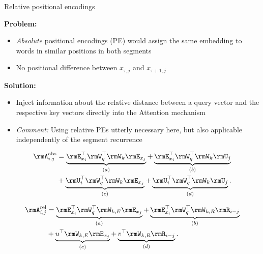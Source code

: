 \documentclass[11pt,compress,t,notes=noshow, xcolor=table]{beamer}
\begin{document}

\begin{vbframe}{Relative positional encodings}

\vfill

\textbf{Problem:}

\begin{itemize}
	\item \textit{Absolute} positional encodings (PE) would assign the same embedding to words in similar positions in both segments
	\item No positional difference between $x_{\tau,j}$ and $x_{\tau+1,j}$
\end{itemize}

\textbf{Solution:}

\begin{itemize}
	\item Inject information about the relative distance between a query vector and the respective key vectors directly into the Attention mechanism
	\item \textit{Comment:} Using relative PEs utterly necessary here, but also applicable independently of the segment recurrence
\end{itemize}

\begin{align*}
	\rmA_{i,j}^\text{abs} 
	&= \underbrace{ \rmE_{x_i}^\top \rmW_q^\top \rmW_k \rmE_{x_j} }_{(a)}
	+ \underbrace{\rmE_{x_i}^\top \rmW_q^\top \rmW_k \rmU_{j}}_{(b)} \\
	&+ \underbrace{\rmU_{i}^\top \rmW_q^\top \rmW_k \rmE_{x_j}}_{(c)}
	+ \underbrace{\rmU_{i}^\top \rmW_q^\top \rmW_k \rmU_{j}}_{(d)}. \vspace{-0.5em}
\end{align*}

\begin{align*}
	\rmA_{i,j}^\text{rel}
	&= \underbrace{ \rmE_{x_i}^\top \rmW_q^\top \rmW_{k,E} \rmE_{x_j} }_{(a)}
	+ \underbrace{\rmE_{x_i}^\top \rmW_q^\top \rmW_{k,R} \rmR_{i-j} }_{(b)} \\
	&+ \underbrace{u^\top \rmW_{k,E} \rmE_{x_j}}_{(c)}
	+ \underbrace{v^\top \rmW_{k,R} \rmR_{i-j}}_{(d)}.
\end{align*}

\end{vbframe}

\end{document}
